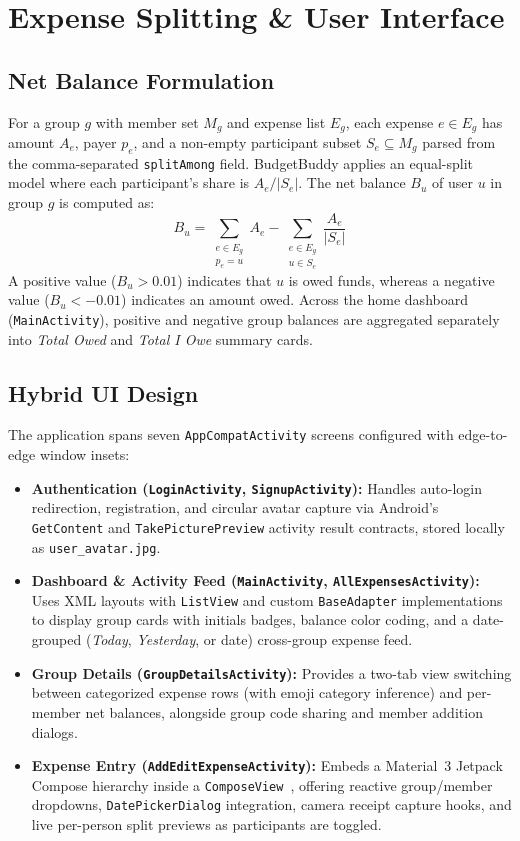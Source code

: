 \documentclass[sigconf,nonacm]{acmart}
\begin{document}
\section{Expense Splitting \& User Interface}
\subsection{Net Balance Formulation}
For a group $g$ with member set $M_g$ and expense list $E_g$, each expense $e \in E_g$ has amount $A_e$, payer $p_e$, and a non-empty participant subset $S_e \subseteq M_g$ parsed from the comma-separated \texttt{splitAmong} field. BudgetBuddy applies an equal-split model where each participant's share is $A_e / |S_e|$. The net balance $B_u$ of user $u$ in group $g$ is computed as:
\begin{equation}
  B_u = \sum_{\substack{e \in E_g \\ p_e = u}} A_e - \sum_{\substack{e \in E_g \\ u \in S_e}} \frac{A_e}{|S_e|}
\end{equation}
A positive value ($B_u > 0.01$) indicates that $u$ is owed funds, whereas a negative value ($B_u < -0.01$) indicates an amount owed. Across the home dashboard (\texttt{MainActivity}), positive and negative group balances are aggregated separately into \emph{Total Owed} and \emph{Total I Owe} summary cards.

\subsection{Hybrid UI Design}
The application spans seven \texttt{AppCompatActivity} screens configured with edge-to-edge window insets:
\begin{itemize}
  \item \textbf{Authentication (\texttt{LoginActivity}, \texttt{SignupActivity}):} Handles auto-login redirection, registration, and circular avatar capture via Android's \texttt{GetContent} and \texttt{TakePicturePreview} activity result contracts, stored locally as \texttt{user\_avatar.jpg}.
  \item \textbf{Dashboard \& Activity Feed (\texttt{MainActivity}, \texttt{AllExpensesActivity}):} Uses XML layouts with \texttt{ListView} and custom \texttt{BaseAdapter} implementations to display group cards with initials badges, balance color coding, and a date-grouped (\emph{Today}, \emph{Yesterday}, or date) cross-group expense feed.
  \item \textbf{Group Details (\texttt{GroupDetailsActivity}):} Provides a two-tab view switching between categorized expense rows (with emoji category inference) and per-member net balances, alongside group code sharing and member addition dialogs.
  \item \textbf{Expense Entry (\texttt{AddEditExpenseActivity}):} Embeds a Material~3 Jetpack Compose hierarchy inside a \texttt{ComposeView}~\cite{compose}, offering reactive group/member dropdowns, \texttt{DatePickerDialog} integration, camera receipt capture hooks, and live per-person split previews as participants are toggled.
\end{itemize}
\end{document}
